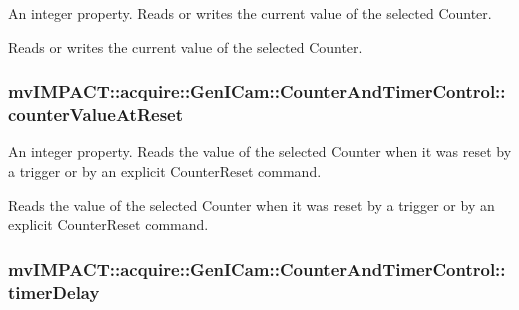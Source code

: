 An integer property. Reads or writes the current value of the selected Counter. 

Reads or writes the current value of the selected Counter. \hypertarget{classmv_i_m_p_a_c_t_1_1acquire_1_1_gen_i_cam_1_1_counter_and_timer_control_a545eb5fdfc9e07d616a39080813acfd1}{
\subsubsection[{counter\+Value\+At\+Reset}]{ mv\+I\+M\+P\+A\+C\+T\+::acquire\+::\+Gen\+I\+Cam\+::\+Counter\+And\+Timer\+Control\+::counter\+Value\+At\+Reset}}\label{classmv_i_m_p_a_c_t_1_1acquire_1_1_gen_i_cam_1_1_counter_and_timer_control_a545eb5fdfc9e07d616a39080813acfd1}


An integer property. Reads the value of the selected Counter when it was reset by a trigger or by an explicit Counter\+Reset command. 

Reads the value of the selected Counter when it was reset by a trigger or by an explicit Counter\+Reset command. \hypertarget{classmv_i_m_p_a_c_t_1_1acquire_1_1_gen_i_cam_1_1_counter_and_timer_control_aed0a836e1b087f5d8977334073e34788}{
\subsubsection[{timer\+Delay}]{ mv\+I\+M\+P\+A\+C\+T\+::acquire\+::\+Gen\+I\+Cam\+::\+Counter\+And\+Timer\+Control\+::timer\+Delay}}\label{classmv_i_m_p_a_c_t_1_1acquire_1_1_gen_i_cam_1_1_counter_and_timer_control_aed0a836e1b087f5d8977334073e34788}



